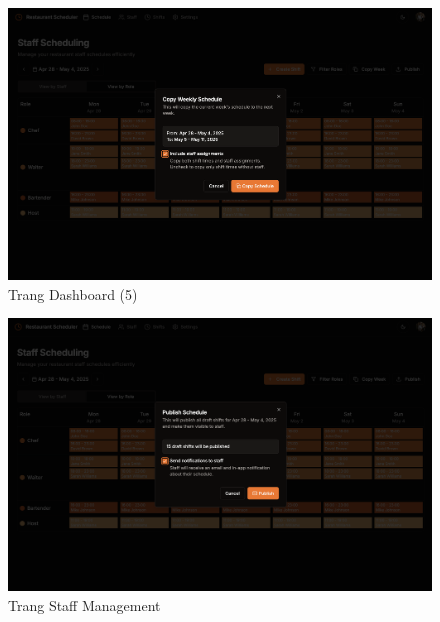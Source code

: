 \begin{figure}[H]
	\centering
	\includegraphics[width=15cm]{Sections/tong_quan/functional_spec/img/proto1.5.png}

     \vspace{0.5cm}
    \caption{Trang Dashboard (5)}
\end{figure}
\begin{figure}[H]
	\centering
	\includegraphics[width=15cm]{Sections/tong_quan/functional_spec/img/proto1.6.png}

     \vspace{0.5cm}
    \caption{Trang Staff Management}
\end{figure}
